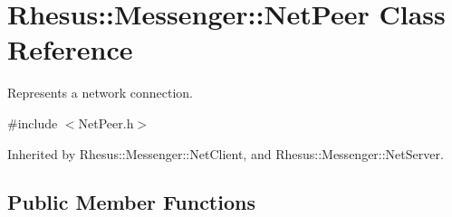\hypertarget{class_rhesus_1_1_messenger_1_1_net_peer}{\section{Rhesus\-:\-:Messenger\-:\-:Net\-Peer Class Reference}
\label{class_rhesus_1_1_messenger_1_1_net_peer}
}


Represents a network connection.  




{\ttfamily \#include $<$Net\-Peer.\-h$>$}



Inherited by Rhesus\-::\-Messenger\-::\-Net\-Client, and Rhesus\-::\-Messenger\-::\-Net\-Server.

\subsection*{Public Member Functions}
